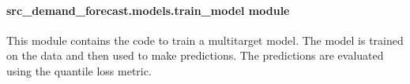 \documentclass[letterpaper,10pt,english]{sphinxmanual}
\begin{document}
\paragraph{src\_demand\_forecast.models.train\_model module}
\label{\detokenize{src_demand_forecast.models:module-src_demand_forecast.models.train_model}}\label{\detokenize{src_demand_forecast.models:src-demand-forecast-models-train-model-module}}
\sphinxAtStartPar
This module contains the code to train a multi\sphinxhyphen{}target model.
The model is trained on the data and then used to make predictions.
The predictions are evaluated using the quantile loss metric.
\end{document}
